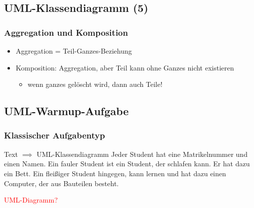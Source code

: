 \documentclass[18pt]{beamer}
\begin{document}
	\subsection{UML-Klassendiagramm (5)}
	\begin{frame}
		\frametitle{Aggregation und Komposition}
		\begin{itemize}
			\item Aggregation = Teil-Ganzes-Beziehung
		\end{itemize}
			\begin{figure}
			\centering
		\end{figure}
	\pause
		\begin{itemize}
			\item Komposition: Aggregation, aber Teil kann ohne Ganzes nicht existieren
			\begin{itemize}
				\item wenn ganzes gelöscht wird, dann auch Teile!
			\end{itemize}
		\end{itemize}
				\begin{figure}
		\centering
	\end{figure}
\end{frame}

	\subsection{UML-Warmup-Aufgabe}
	\begin{frame}
		\frametitle{Klassischer Aufgabentyp}
		\begin{exampleblock}{Text $\implies$ UML-Klassendiagramm}
			Jeder Student hat eine Matrikelnummer und einen Namen. Ein fauler Student ist ein Student, der schlafen kann. Er hat dazu ein Bett. Ein fleißiger Student hingegen, kann lernen und hat dazu einen Computer, der aus Bauteilen besteht.
		\end{exampleblock}
	\pause
	\textcolor{red}{UML-Diagramm?}
\end{frame}
\end{document}

